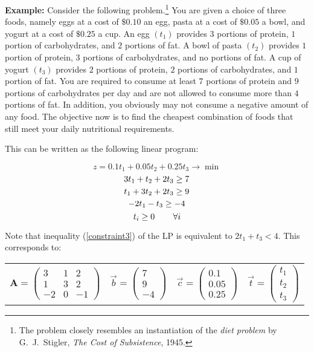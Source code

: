 \textbf{Example: }
Consider the following problem.\footnote{The problem closely resembles an
instantiation of the {\em diet problem} by G.~J.~Stigler, {\em The Cost of
Subsistence}, 1945.} You are given a choice of three foods, namely eggs at a
cost of $\$0.10$ an egg, pasta at a cost of $\$0.05$ a bowl, and yogurt at a cost
of $\$0.25$ a cup.  An egg $(t_1)$ provides $3$ portions of protein, $1$ portion of
carbohydrates, and $2$ portions of fat.  A bowl of pasta $(t_2)$ provides $1$ portion of
protein, $3$ portions of carbohydrates, and no portions of fat.  A cup of yogurt $(t_3)$
provides $2$ portions of protein, $2$ portions of carbohydrates, and $1$ portion of
fat.  You are required to consume at least $7$ portions of protein and $9$
portions of carbohydrates per day and are not allowed to consume more than $4$
portions of fat.  In addition, you obviously may not consume a negative amount
of any food.  The objective now is to find the cheapest combination of foods
that still meet your daily nutritional requirements. 

This can be written as the following linear program:

\begin{equation}
z = 0.1t_1 + 0.05t_2 + 0.25t_3 \to \min
\end{equation}
\begin{equation}
3t_1 + t_2 + 2t_3 \geq 7 \\
\end{equation}
\begin{equation}
t_1 + 3t_2 + 2t_3 \geq 9 \\
\end{equation}
\begin{equation}
-2t_1 - t_3 \geq -4 \\
\label{constraint3}
\end{equation}
\begin{equation}
t_i \geq 0 \hspace{0.3in} \forall i
\end{equation}

Note that inequality (\ref{constraint3}) of the LP is equivalent to $2t_1 +
t_3 < 4$. This corresponds to:

\begin{tabular}{cccc}
${\mathbf A} = \left ( \begin{array}{ccc}3 & 1 & 2\\1 & 3 & 2\\-2 & 0 & -1 \end{array} \right ) $
&
$\vec{b} = \left ( \begin{array}{c}7\\9\\-4\end{array} \right ) $
&
$\vec{c} = \left ( \begin{array}{c}0.1\\0.05\\0.25\end{array} \right ) $
&
$\vec{t} = \left ( \begin{array}{c}t_1\\t_2\\t_3\end{array} \right ) $
\end{tabular}

